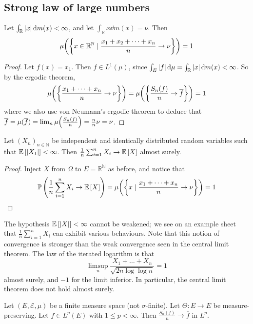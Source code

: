 \subsection{Strong law of large numbers}
\begin{theorem}
	Let \( \int_{\mathbb R} \abs{x} \dd{m(x)} < \infty \), and let \( \int_{\mathbb R} x \dd{m(x)} = \nu \).
	Then
	\[ \mu\qty(\qty{x \in \mathbb R^{\mathbb N} \mid \frac{x_1 + x_2 + \dots + x_n}{n} \to \nu}) = 1 \]
\end{theorem}
\begin{proof}
	Let \( f(x) = x_1 \).
	Then \( f \in L^1(\mu) \), since \( \int_E \abs{f} \dd{\mu} = \int_{\mathbb R} \abs{x} \dd{m(x)} < \infty \).
	So by the ergodic theorem,
	\[ \mu\qty(\qty{ \frac{x_1 + \dots + x_n}{n} \to \nu }) = \mu\qty(\qty{ \frac{S_n(f)}{n} \to \overline f }) = 1 \]
	where we also use von Neumann's ergodic theorem to deduce that \( \overline f = \mu(\overline f) = \lim_n \mu\qty(\frac{S_n(f)}{n}) = \frac{n}{n} \nu = \nu \).
\end{proof}
\begin{theorem}
	Let \( (X_n)_{n \in \mathbb N} \) be independent and identically distributed random variables such that \( \mathbb{E}\left[{\abs{X_1}}\right] < \infty \).
	Then \( \frac{1}{n} \sum_{i=1}^n X_i \to \mathbb{E}\left[{X}\right] \) almost surely.
\end{theorem}
\begin{proof}
	Inject \( X \) from \( \Omega \) to \( E = \mathbb R^{\mathbb N} \) as before, and notice that
	\[ \mathbb{P}\left({\frac{1}{n} \sum_{i=1}^n X_i \to \mathbb{E}\left[{X}\right]}\right) = \mu\qty(\qty{ x \mid \frac{x_1 + \dots + x_n}{n} \to \nu }) = 1 \]
\end{proof}
\begin{remark}
	The hypothesis \( \mathbb{E}\left[{\abs{X}}\right] < \infty \) cannot be weakened; we see on an example sheet that \( \frac{1}{n} \sum_{i=1}^n X_i \) can exhibit various behaviours.
	Note that this notion of convergence is stronger than the weak convergence seen in the central limit theorem.
	The law of the iterated logarithm is that
	\[ \limsup_n \frac{X_1 + \dots + X_n}{\sqrt{2 n \log \log n}} = 1 \]
	almost surely, and \( -1 \) for the limit inferior.
	In particular, the central limit theorem does not hold almost surely.
\end{remark}
\begin{theorem}
	Let \( (E, \mathcal E, \mu) \) be a finite measure space (not \( \sigma \)-finite).
	Let \( \Theta \colon E \to E \) be measure-preserving.
	Let \( f \in L^p(E) \) with \( 1 \leq p < \infty \).
	Then \( \frac{S_n(f)}{n} \to \overline f \) in \( L^p \).
\end{theorem}

